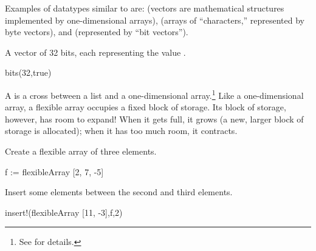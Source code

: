 {{{{{{{{\begin{xtc}
\end{xtc}

Examples of datatypes similar to 
are:  (vectors are mathematical structures
implemented by one-dimensional arrays),  (arrays
of ``characters,'' represented by byte vectors), and
 (represented by ``bit vectors'').

\begin{xtc}
\begin{xtccomment}
A vector of 32 bits, each representing the  value .
\end{xtccomment}
\begin{spadsrc}
bits(32,true)
\end{spadsrc}
\begin{TeXOutput}
\begin{fricasmath}{10}
%
\end{fricasmath}
\end{TeXOutput}
\end{xtc}

A  is a cross between a list
and a one-dimensional array.\footnote{See  for
details.}
Like a one-dimensional array, a flexible array occupies a fixed
block of storage.
Its block of storage, however, has room to expand!
When it gets full, it grows (a new, larger block of storage is
allocated); when it has too much room, it contracts.

\begin{xtc}
\begin{xtccomment}
Create a flexible array of three elements.
\end{xtccomment}
\begin{spadsrc}
f := flexibleArray [2, 7, -5]
\end{spadsrc}
\begin{TeXOutput}
\begin{fricasmath}{11}
%
\end{fricasmath}
\end{TeXOutput}
\end{xtc}
\begin{xtc}
\begin{xtccomment}
Insert some elements between the second and third elements.
\end{xtccomment}
\begin{spadsrc}
insert!(flexibleArray [11, -3],f,2)
\end{spadsrc}
\begin{TeXOutput}
\begin{fricasmath}{12}
%
\end{fricasmath}
\end{TeXOutput}
\end{xtc}

}}}}}}}}
